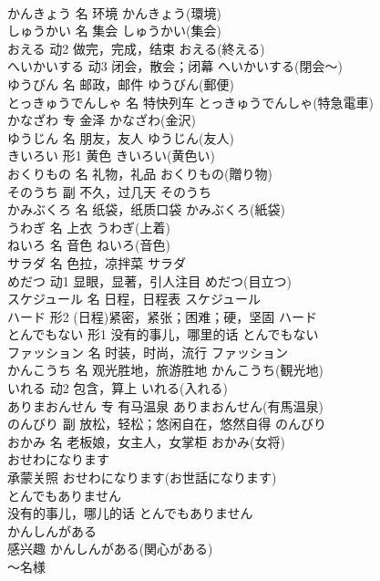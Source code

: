 \documentclass[8pt]{extreport}
\begin{document}
\begin{CJK}{UTF8}{min}
\\	かんきょう	名	环境	かんきょう(環境)	
\\	しゅうかい	名	集会	しゅうかい(集会)	
\\	おえる	动2	做完，完成，结束	おえる(終える)	
\\	へいかいする	动3	闭会，散会；闭幕	へいかいする(閉会～)	
\\	ゆうびん	名	邮政，邮件	ゆうびん(郵便)	
\\	とっきゅうでんしゃ	名	特快列车	とっきゅうでんしゃ(特急電車)	
\\	かなざわ	专	金泽	かなざわ(金沢)	
\\	ゆうじん	名	朋友，友人	ゆうじん(友人)	
\\	きいろい	形1	黄色	きいろい(黄色い)	
\\	おくりもの	名	礼物，礼品	おくりもの(贈り物)	
\\	そのうち	副	不久，过几天	そのうち	
\\	かみぶくろ	名	纸袋，纸质口袋	かみぶくろ(紙袋)	
\\	うわぎ	名	上衣	うわぎ(上着)	
\\	ねいろ	名	音色	ねいろ(音色)	
\\	サラダ	名	色拉，凉拌菜	サラダ	
\\	めだつ	动1	显眼，显著，引人注目	めだつ(目立つ)	
\\	スケジュール	名	日程，日程表	スケジュール	
\\	ハード	形2	(日程)紧密，紧张；困难；硬，坚固	ハード	
\\	とんでもない	形1	没有的事儿，哪里的话	とんでもない	
\\	ファッション	名	时装，时尚，流行	ファッション	
\\	かんこうち	名	观光胜地，旅游胜地	かんこうち(観光地)	
\\	いれる	动2	包含，算上	いれる(入れる)	
\\	ありまおんせん	专	有马温泉	ありまおんせん(有馬温泉)	
\\	のんびり	副	放松，轻松；悠闲自在，悠然自得	のんびり	
\\	おかみ	名	老板娘，女主人，女掌柜	おかみ(女将)	
\\	おせわになります	
\\	承蒙关照	おせわになります(お世話になります)	
\\	とんでもありません	
\\	没有的事儿，哪儿的话	とんでもありません	
\\	かんしんがある	
\\	感兴趣	かんしんがある(関心がある)	
\\	～名様	

\end{CJK}
\end{document}

